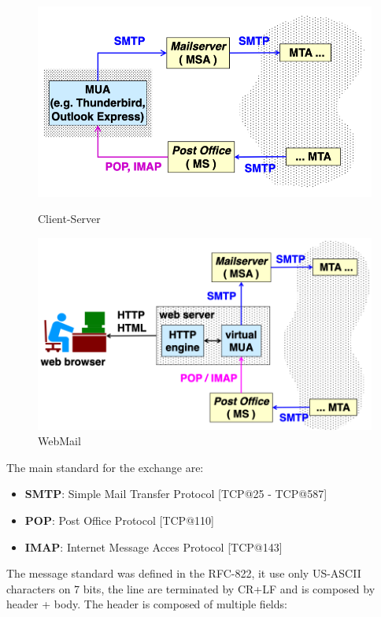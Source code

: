 \documentclass[12pt]{article}
\begin{document}
\begin{figure}[h!]
  \centering
  \begin{minipage}{.48\textwidth}
    \centering
    \includegraphics[width=\linewidth]{images/cs_mail.png}
    \caption{Client-Server}
    \label{fig:cs_mail}
  \end{minipage}\hfill
  \begin{minipage}{.48\textwidth}
    \centering
    \includegraphics[width=\linewidth]{images/webmail.png}
    \caption{WebMail}
    \label{fig:webmail}
  \end{minipage}\hfill
\end{figure}
The main standard for the exchange are:
\begin{itemize}
  \item \textbf{SMTP}: Simple Mail Transfer Protocol [TCP@25 - TCP@587]
  \item \textbf{POP}: Post Office Protocol [TCP@110]
  \item \textbf{IMAP}: Internet Message Acces Protocol [TCP@143]
\end{itemize}
The message standard was defined in the RFC-822, it use only US-ASCII characters on 7 bits, the line are terminated by CR+LF and is composed by header + body. The header is composed of multiple fields:
\end{document}
